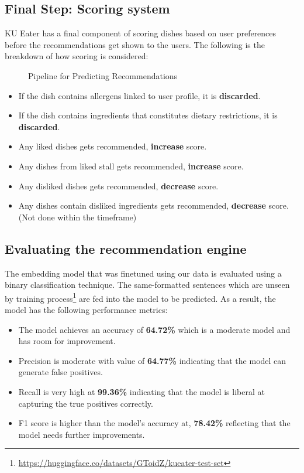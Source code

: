 \subsection{Final Step: Scoring system}
KU Eater has a final component of scoring dishes based on user preferences
before the recommendations get shown to the users. The following is the breakdown of
how scoring is considered:

\begin{figure}[h!]
    \centering
    
    \caption{Pipeline for Predicting Recommendations}
    \label{fig:pipeline-for-predicting-2}
\end{figure}

\begin{itemize}[leftmargin=80pt]
    \item If the dish contains allergens linked to user profile, it is \textbf{discarded}.
    \item If the dish contains ingredients that constitutes dietary restrictions, it is \textbf{discarded}.
    \item Any liked dishes gets recommended, \textbf{increase} score.
    \item Any dishes from liked stall gets recommended, \textbf{increase} score.
    \item Any disliked dishes gets recommended, \textbf{decrease} score.
    \item Any dishes contain disliked ingredients gets recommended, \textbf{decrease} score. (Not done within the timeframe)
\end{itemize}

\subsection{Evaluating the recommendation engine}
\label{subsection:recsys-eval}
The embedding model that was finetuned using our data is evaluated using a binary classification technique.
The same-formatted sentences which are unseen by training process\footnote{\url{https://huggingface.co/datasets/GToidZ/kueater-test-set}}
are fed into the model to be predicted. As a result, the model has the following performance metrics:

\begin{itemize}[leftmargin=80pt]
    \item The model achieves an accuracy of \textbf{64.72\%} which is a moderate model and has room for improvement.
    \item Precision is moderate with value of \textbf{64.77\%} indicating that the model can generate false positives.
    \item Recall is very high at \textbf{99.36\%} indicating that the model is liberal at capturing the true positives correctly.
    \item F1 score is higher than the model's accuracy at, \textbf{78.42\%} reflecting that the model needs further improvements.
\end{itemize}

